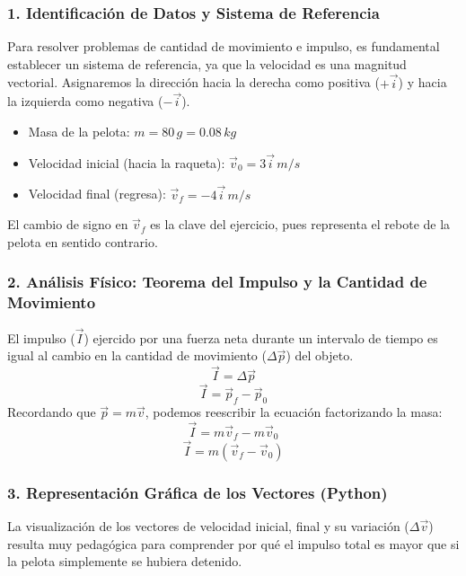 \documentclass[12pt, a4paper]{article}
\begin{document}
\subsubsection*{1. Identificación de Datos y Sistema de Referencia}
Para resolver problemas de cantidad de movimiento e impulso, es fundamental establecer un sistema de referencia, ya que la velocidad es una magnitud vectorial. Asignaremos la dirección hacia la derecha como positiva ($+\vec{i}$) y hacia la izquierda como negativa ($-\vec{i}$).

\begin{itemize}
    \item Masa de la pelota: $m = 80 \, \si{g} = 0.08 \, \si{kg}$
    \item Velocidad inicial (hacia la raqueta): $\vec{v}_0 = 3 \vec{i} \, \si{m/s}$
    \item Velocidad final (regresa): $\vec{v}_f = -4 \vec{i} \, \si{m/s}$
\end{itemize}
El cambio de signo en $\vec{v}_f$ es la clave del ejercicio, pues representa el rebote de la pelota en sentido contrario.

\subsubsection*{2. Análisis Físico: Teorema del Impulso y la Cantidad de Movimiento}
El impulso ($\vec{I}$) ejercido por una fuerza neta durante un intervalo de tiempo es igual al cambio en la cantidad de movimiento ($\Delta\vec{p}$) del objeto. 
\[ \vec{I} = \Delta\vec{p} \]
\[ \vec{I} = \vec{p}_f - \vec{p}_0 \]
Recordando que $\vec{p} = m\vec{v}$, podemos reescribir la ecuación factorizando la masa:
\[ \vec{I} = m\vec{v}_f - m\vec{v}_0 \]
\[ \vec{I} = m(\vec{v}_f - \vec{v}_0) \]

\subsubsection*{3. Representación Gráfica de los Vectores (Python)}
La visualización de los vectores de velocidad inicial, final y su variación ($\Delta\vec{v}$) resulta muy pedagógica para comprender por qué el impulso total es mayor que si la pelota simplemente se hubiera detenido.
\end{document}
